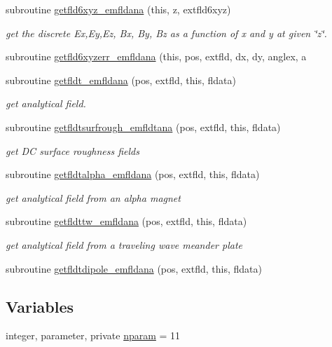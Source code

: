\begin{DoxyCompactItemize}
subroutine \mbox{\hyperlink{namespaceemfldanaclass_a8cc6ab7d703889424d80d660ca470042}{getfld6xyz\+\_\+emfldana}} (this, z, extfld6xyz)
\begin{DoxyCompactList}\small\item\em get the discrete Ex,Ey,Ez, Bx, By, Bz as a function of x and y at given \char`\"{}z\char`\"{}. \end{DoxyCompactList}\item 
subroutine \mbox{\hyperlink{namespaceemfldanaclass_a0abd49dbf81da65741c9bf08b9900a46}{getfld6xyzerr\+\_\+emfldana}} (this, pos, extfld, dx, dy, anglex, a
\item 
subroutine \mbox{\hyperlink{namespaceemfldanaclass_a7ecbabd3d9e65aadaf2e8ccb096c6eed}{getfldt\+\_\+emfldana}} (pos, extfld, this, fldata)
\begin{DoxyCompactList}\small\item\em get analytical field. \end{DoxyCompactList}\item 
subroutine \mbox{\hyperlink{namespaceemfldanaclass_ac3c4c5ce44722c1aa2ba2d10700e0215}{getfldtsurfrough\+\_\+emfldtana}} (pos, extfld, this, fldata)
\begin{DoxyCompactList}\small\item\em get DC surface roughness fields \end{DoxyCompactList}\item 
subroutine \mbox{\hyperlink{namespaceemfldanaclass_a8e64e65ca00c486db83f7f7152aa5744}{getfldtalpha\+\_\+emfldana}} (pos, extfld, this, fldata)
\begin{DoxyCompactList}\small\item\em get analytical field from an alpha magnet \end{DoxyCompactList}\item 
subroutine \mbox{\hyperlink{namespaceemfldanaclass_a49f218450fbccc7099479730313a5ec1}{getfldttw\+\_\+emfldana}} (pos, extfld, this, fldata)
\begin{DoxyCompactList}\small\item\em get analytical field from a traveling wave meander plate \end{DoxyCompactList}\item 
subroutine \mbox{\hyperlink{namespaceemfldanaclass_aa9ea3d7a230bc88c83be56723c8d96a6}{getfldtdipole\+\_\+emfldana}} (pos, extfld, this, fldata)
\end{DoxyCompactItemize}
\subsection*{Variables}
\begin{DoxyCompactItemize}
\item 
integer, parameter, private \mbox{\hyperlink{namespaceemfldanaclass_a3ce28adb644b4d35b7f3e9713a275828}{nparam}} = 11
\end{DoxyCompactItemize}


